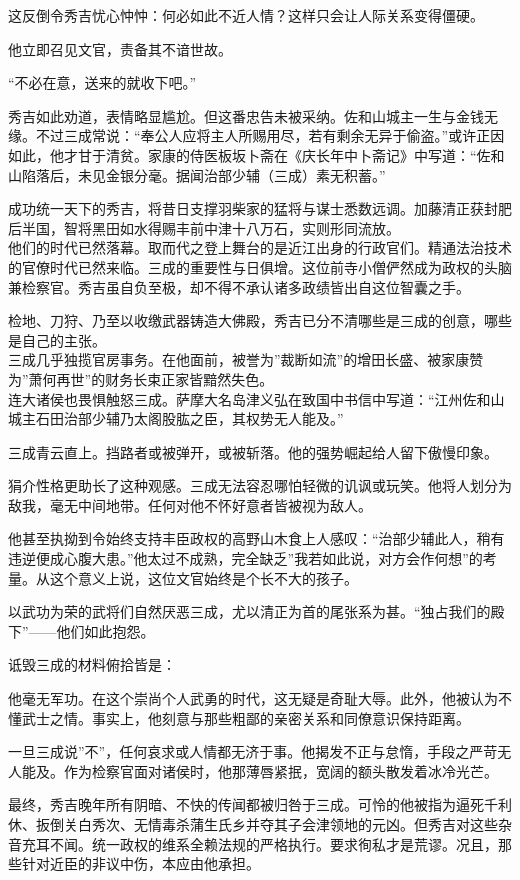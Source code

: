 \documentclass[
]{article}
\begin{document}
这反倒令秀吉忧心忡忡：何必如此不近人情？这样只会让人际关系变得僵硬。

他立即召见文官，责备其不谙世故。

``不必在意，送来的就收下吧。''

秀吉如此劝道，表情略显尴尬。但这番忠告未被采纳。佐和山城主一生与金钱无缘。不过三成常说：``奉公人应将主人所赐用尽，若有剩余无异于偷盗。''或许正因如此，他才甘于清贫。家康的侍医板坂卜斋在《庆长年中卜斋记》中写道：``佐和山陷落后，未见金银分毫。据闻治部少辅（三成）素无积蓄。''

成功统一天下的秀吉，将昔日支撑羽柴家的猛将与谋士悉数远调。加藤清正获封肥后半国，智将黑田如水得赐丰前中津十八万石，实则形同流放。\\
他们的时代已然落幕。取而代之登上舞台的是近江出身的行政官们。精通法治技术的官僚时代已然来临。三成的重要性与日俱增。这位前寺小僧俨然成为政权的头脑兼检察官。秀吉虽自负至极，却不得不承认诸多政绩皆出自这位智囊之手。

检地、刀狩、乃至以收缴武器铸造大佛殿，秀吉已分不清哪些是三成的创意，哪些是自己的主张。\\
三成几乎独揽官房事务。在他面前，被誉为''裁断如流''的增田长盛、被家康赞为''萧何再世''的财务长束正家皆黯然失色。\\
连大诸侯也畏惧触怒三成。萨摩大名岛津义弘在致国中书信中写道：``江州佐和山城主石田治部少辅乃太阁股肱之臣，其权势无人能及。''

三成青云直上。挡路者或被弹开，或被斩落。他的强势崛起给人留下傲慢印象。

狷介性格更助长了这种观感。三成无法容忍哪怕轻微的讥讽或玩笑。他将人划分为敌我，毫无中间地带。任何对他不怀好意者皆被视为敌人。

他甚至执拗到令始终支持丰臣政权的高野山木食上人感叹：``治部少辅此人，稍有违逆便成心腹大患。''他太过不成熟，完全缺乏''我若如此说，对方会作何想''的考量。从这个意义上说，这位文官始终是个长不大的孩子。

以武功为荣的武将们自然厌恶三成，尤以清正为首的尾张系为甚。``独占我们的殿下''------他们如此抱怨。

诋毁三成的材料俯拾皆是：

他毫无军功。在这个崇尚个人武勇的时代，这无疑是奇耻大辱。此外，他被认为不懂武士之情。事实上，他刻意与那些粗鄙的亲密关系和同僚意识保持距离。

一旦三成说''不''，任何哀求或人情都无济于事。他揭发不正与怠惰，手段之严苛无人能及。作为检察官面对诸侯时，他那薄唇紧抿，宽阔的额头散发着冰冷光芒。

最终，秀吉晚年所有阴暗、不快的传闻都被归咎于三成。可怜的他被指为逼死千利休、扳倒关白秀次、无情毒杀蒲生氏乡并夺其子会津领地的元凶。但秀吉对这些杂音充耳不闻。统一政权的维系全赖法规的严格执行。要求徇私才是荒谬。况且，那些针对近臣的非议中伤，本应由他承担。
\end{document}
